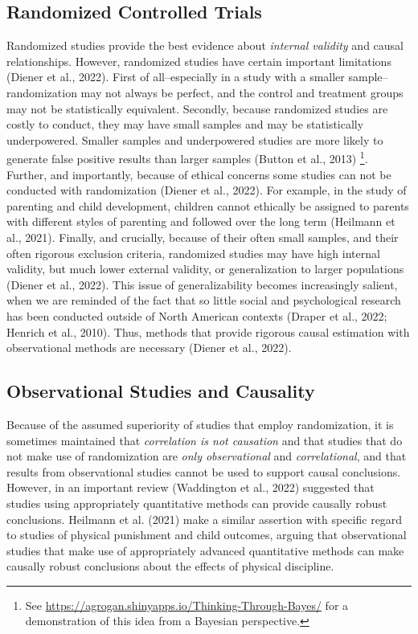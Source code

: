 \documentclass[
  letterpaper,
  DIV=11,
  numbers=noendperiod]{scrreprt}
\begin{document}
\subsection{Randomized Controlled
Trials}\label{randomized-controlled-trials}

Randomized studies provide the best evidence about \emph{internal
validity} and causal relationships. However, randomized studies have
certain important limitations (Diener et al., 2022). First of
all--especially in a study with a smaller sample--randomization may not
always be perfect, and the control and treatment groups may not be
statistically equivalent. Secondly, because randomized studies are
costly to conduct, they may have small samples and may be statistically
underpowered. Smaller samples and underpowered studies are more likely
to generate false positive results than larger samples (Button et al.,
2013) \footnote{See
  \url{https://agrogan.shinyapps.io/Thinking-Through-Bayes/} for a
  demonstration of this idea from a Bayesian perspective.}. Further, and
importantly, because of ethical concerns some studies can not be
conducted with randomization (Diener et al., 2022). For example, in the
study of parenting and child development, children cannot ethically be
assigned to parents with different styles of parenting and followed over
the long term (Heilmann et al., 2021). Finally, and crucially, because
of their often small samples, and their often rigorous exclusion
criteria, randomized studies may have high internal validity, but much
lower external validity, or generalization to larger populations (Diener
et al., 2022). This issue of generalizability becomes increasingly
salient, when we are reminded of the fact that so little social and
psychological research has been conducted outside of North American
contexts (Draper et al., 2022; Henrich et al., 2010). Thus, methods that
provide rigorous causal estimation with observational methods are
necessary (Diener et al., 2022).

\subsection{Observational Studies and
Causality}\label{observational-studies-and-causality}

Because of the assumed superiority of studies that employ randomization,
it is sometimes maintained that \emph{correlation is not causation} and
that studies that do not make use of randomization are \emph{only
observational} and \emph{correlational}, and that results from
observational studies cannot be used to support causal conclusions.
However, in an important review (Waddington et al., 2022) suggested that
studies using appropriately quantitative methods can provide causally
robust conclusions. Heilmann et al. (2021) make a similar assertion with
specific regard to studies of physical punishment and child outcomes,
arguing that observational studies that make use of appropriately
advanced quantitative methods can make causally robust conclusions about
the effects of physical discipline.
\end{document}
